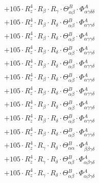 \documentclass{article}
\begin{document}
\begin{subequations}
\begin{gather}
\begin{array}{c}
 \\[0.2em] 		 + 105 \cdot R_{z}^{4} \cdot R_{\beta{}} \cdot R_{\gamma{}} \cdot \Theta{}^{B}_{\alpha{}\beta{}} \cdot \Phi{}^{A}_{\alpha{}\gamma{}\delta{}\delta{}} 
 \\[0.2em] 		 + 105 \cdot R_{z}^{4} \cdot R_{\beta{}} \cdot R_{\delta{}} \cdot \Theta{}^{B}_{\alpha{}\beta{}} \cdot \Phi{}^{A}_{\alpha{}\gamma{}\gamma{}\delta{}} 
 \\[0.2em] 		 + 105 \cdot R_{z}^{4} \cdot R_{\beta{}} \cdot R_{\delta{}} \cdot \Theta{}^{B}_{\alpha{}\beta{}} \cdot \Phi{}^{A}_{\alpha{}\gamma{}\gamma{}\delta{}} 
 \\[0.2em] 		 + 105 \cdot R_{z}^{4} \cdot R_{\beta{}} \cdot R_{\delta{}} \cdot \Theta{}^{B}_{\alpha{}\beta{}} \cdot \Phi{}^{A}_{\alpha{}\gamma{}\gamma{}\delta{}} 
 \\[0.2em] 		 + 105 \cdot R_{z}^{4} \cdot R_{\beta{}} \cdot R_{\delta{}} \cdot \Theta{}^{B}_{\alpha{}\beta{}} \cdot \Phi{}^{A}_{\alpha{}\gamma{}\gamma{}\delta{}} 
 \\[0.2em] 		 + 105 \cdot R_{z}^{4} \cdot R_{\beta{}} \cdot R_{\delta{}} \cdot \Theta{}^{B}_{\alpha{}\beta{}} \cdot \Phi{}^{A}_{\alpha{}\gamma{}\gamma{}\delta{}} 
 \\[0.2em] 		 + 105 \cdot R_{z}^{4} \cdot R_{\beta{}} \cdot R_{\delta{}} \cdot \Theta{}^{B}_{\alpha{}\beta{}} \cdot \Phi{}^{A}_{\alpha{}\gamma{}\gamma{}\delta{}} 
 \\[0.2em] 		 + 105 \cdot R_{z}^{4} \cdot R_{\beta{}} \cdot R_{\delta{}} \cdot \Theta{}^{B}_{\alpha{}\beta{}} \cdot \Phi{}^{A}_{\alpha{}\gamma{}\gamma{}\delta{}} 
 \\[0.2em] 		 + 105 \cdot R_{z}^{4} \cdot R_{\beta{}} \cdot R_{\delta{}} \cdot \Theta{}^{B}_{\alpha{}\beta{}} \cdot \Phi{}^{A}_{\alpha{}\gamma{}\gamma{}\delta{}} 
 \\[0.2em] 		 + 105 \cdot R_{z}^{4} \cdot R_{\beta{}} \cdot R_{\delta{}} \cdot \Theta{}^{B}_{\alpha{}\beta{}} \cdot \Phi{}^{A}_{\alpha{}\gamma{}\gamma{}\delta{}} 
 \\[0.2em] 		 + 105 \cdot R_{z}^{4} \cdot R_{\gamma{}} \cdot R_{\delta{}} \cdot \Theta{}^{B}_{\alpha{}\alpha{}} \cdot \Phi{}^{A}_{\beta{}\beta{}\gamma{}\delta{}} 
 \\[0.2em] 		 + 105 \cdot R_{z}^{4} \cdot R_{\gamma{}} \cdot R_{\delta{}} \cdot \Theta{}^{B}_{\alpha{}\beta{}} \cdot \Phi{}^{A}_{\alpha{}\beta{}\gamma{}\delta{}} 
 \\[0.2em] 		 + 105 \cdot R_{z}^{4} \cdot R_{\gamma{}} \cdot R_{\delta{}} \cdot \Theta{}^{B}_{\alpha{}\beta{}} \cdot \Phi{}^{A}_{\alpha{}\beta{}\gamma{}\delta{}} 

\end{array}
\end{gather}
\end{subequations}
\end{document}
